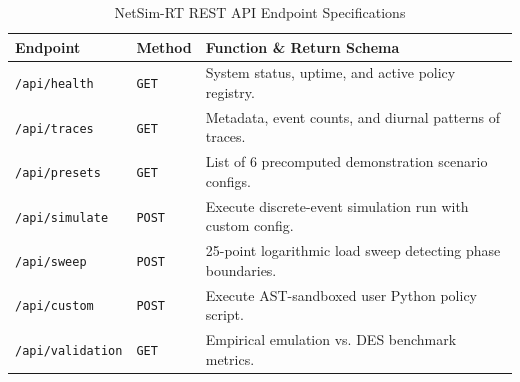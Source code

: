 \begin{table}[h]
\centering
\small
\caption{NetSim-RT REST API Endpoint Specifications}
\label{tab:endpoints}
\begin{tabularx}{\columnwidth}{l l X}
\toprule
\textbf{Endpoint} & \textbf{Method} & \textbf{Function \& Return Schema} \\
\midrule
\texttt{/api/health} & \texttt{GET} & System status, uptime, and active policy registry. \\
\texttt{/api/traces} & \texttt{GET} & Metadata, event counts, and diurnal patterns of traces. \\
\texttt{/api/presets} & \texttt{GET} & List of 6 precomputed demonstration scenario configs. \\
\texttt{/api/simulate} & \texttt{POST} & Execute discrete-event simulation run with custom config. \\
\texttt{/api/sweep} & \texttt{POST} & 25-point logarithmic load sweep detecting phase boundaries. \\
\texttt{/api/custom} & \texttt{POST} & Execute AST-sandboxed user Python policy script. \\
\texttt{/api/validation} & \texttt{GET} & Empirical emulation vs. DES benchmark metrics. \\
\bottomrule
\end{tabularx}
\end{table}
